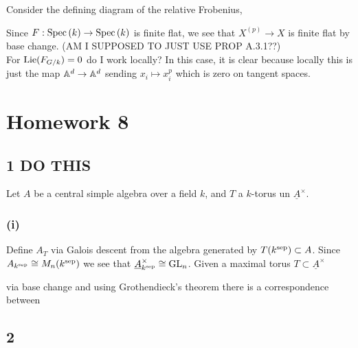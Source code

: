 \documentclass[12pt]{article}
\begin{document}
Consider the defining diagram of the relative Frobenius,
\begin{center}
\end{center}
Since $F : \mathrm{Spec}\left( k \right) \to \mathrm{Spec}\left( k \right)$ is finite flat, we see that $X^{(p)} \to X$ is finite flat by base change. (AM I SUPPOSED TO JUST USE PROP A.3.1??)
\bigskip\\
For $\mathrm{Lie}(F_{G/k}) = 0$ do I work \etale locally? In this case, it is clear because \etale locally this is just the map $\mathbb{A}^d \to \mathbb{A}^d$ sending $x_i \mapsto x_i^p$ which is zero on tangent spaces. 

\section{Homework 8}

\subsection{1 DO THIS}

Let $A$ be a central simple algebra over a field $k$, and $T$ a $k$-torus un $\underline{A}^\times$.

\subsubsection{(i)}

Define $A_T$ via Galois descent from the algebra generated by $T(k^{\mathrm{sep}}) \subset A$. Since $A_{k^{\mathrm{sep}}} \cong M_n(k^{\mathrm{sep}})$ we see that $\underline{A}^\times_{k^{\mathrm{sep}}} \cong \mathrm{GL}_n$. Given a maximal torus $T \subset \underline{A}^\times$ 

 via base change and using Grothendieck's theorem there is a correspondence between


\subsection{2}
\end{document}
